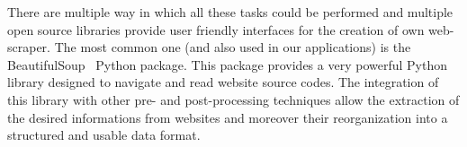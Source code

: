 \documentclass{standalone}
\begin{document}
There are multiple way in which all these tasks could be performed and multiple open source libraries provide user friendly interfaces for the creation of own web-scraper.
The most common one (and also used in our applications) is the \textsf{BeautifulSoup}~\cite{richardson2007beautiful} \textsf{Python} package.
This package provides a very powerful \textsf{Python} library designed to navigate and read website source codes.
The integration of this library with other pre- and post-processing techniques allow the extraction of the desired informations from websites and moreover their reorganization into a structured and usable data format.
\end{document}
